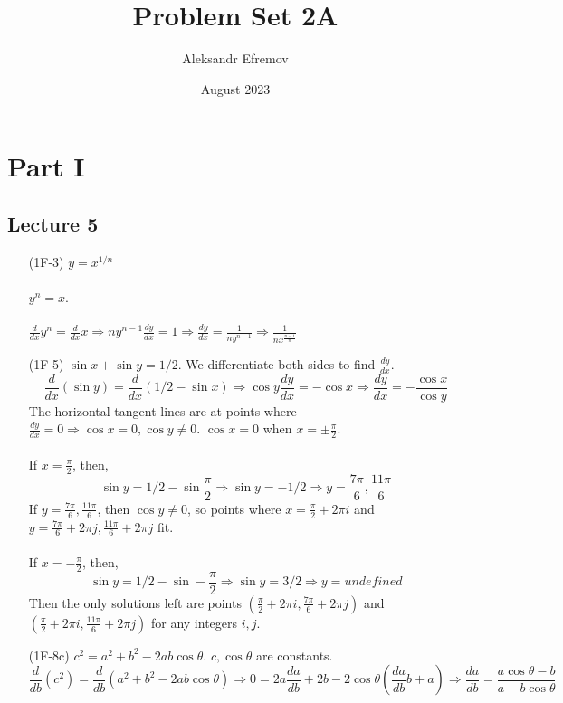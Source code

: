\documentclass{article}
\title{Problem Set 2A}
\author{Aleksandr Efremov}
\date{August 2023}
\begin{document}
\maketitle

\section{Part I}
\subsection{Lecture 5}

\begin{itemize}
    \item[(1F-3)] $y = x^{1/n}$ \\ \\ 
    $y^n = x$. \\ \\
    $\frac{d}{dx}y^n = \frac{d}{dx}x \Rightarrow ny^{n-1}\frac{dy}{dx} = 1 \Rightarrow \frac{dy}{dx} = \frac{1}{ny^{n-1}} \Rightarrow \frac{1}{nx^{\frac{n-1}{n}}}$
    
    \item[(1F-5)] $\sin x + \sin y = 1/2$. We differentiate both sides to find $\frac{dy}{dx}$.
    \[ \frac{d}{dx} (\sin y) = \frac{d}{dx} (1/2 - \sin x) \Rightarrow \cos y \frac{dy}{dx} = -\cos x \Rightarrow \frac{dy}{dx} = -\frac{\cos x}{\cos y} \]
    The horizontal tangent lines are at points where $\frac{dy}{dx} = 0 \Rightarrow \cos x = 0, \cos y \neq 0$. $\cos x = 0$ when $x = \pm \frac{\pi}{2}$. \\ \\ If $x = \frac{\pi}{2}$, then,
    \[ \sin y = 1/2 - \sin \frac{\pi}{2} \Rightarrow \sin y = -1/2 \Rightarrow y = \frac{7\pi}{6}, \frac{11\pi}{6} \]
    If $y = \frac{7\pi}{6}, \frac{11\pi}{6}$, then $\cos y \neq 0$, so points where $x = \frac{\pi}{2} + 2 \pi i$ and $y = \frac{7\pi}{6} + 2 \pi j, \frac{11\pi}{6} + 2 \pi j$ fit. \\ \\ If $x = -\frac{\pi}{2}$, then,
    \[ \sin y = 1/2 - \sin -\frac{\pi}{2} \Rightarrow \sin y = 3/2 \Rightarrow y = undefined \]
    Then the only solutions left are points $\left( \frac{\pi}{2} + 2 \pi i, \frac{7\pi}{6} + 2 \pi j \right)$ and $\left( \frac{\pi}{2} + 2 \pi i, \frac{11\pi}{6} + 2 \pi j \right)$ for any integers $i, j$. 
    
    \item[(1F-8c)] $c^2 = a^2 + b^2 - 2ab \cos \theta$. $c, \cos \theta$ are constants.
    \[ \frac{d}{db}(c^2) = \frac{d}{db}(a^2 + b^2 - 2ab \cos \theta) \Rightarrow 0 = 2a \frac{da}{db} + 2b - 2 \cos \theta \left( \frac{da}{db}b + a \right) \Rightarrow \frac{da}{db} = \frac{a \cos \theta - b}{a - b \cos \theta} \]


\end{itemize}
\end{document}
